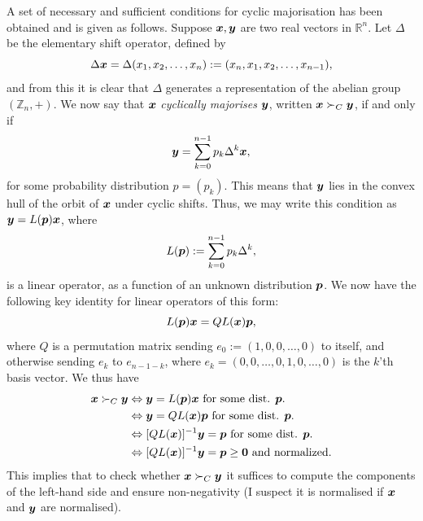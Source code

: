 \documentclass[pra,
aps,
twocolumn,
superscriptaddress,
groupedaddress,
nofootinbib,
reprint
]{revtex4-1}
\begin{document}
A set of necessary and sufficient conditions for cyclic majorisation has been obtained and is given as follows. Suppose $\boldsymbol{x}, \boldsymbol{y}$ are two real vectors in $\mathbb{R}^n$. Let $\Delta$ be the elementary shift operator, defined by
\begin{equation}
\Delta \boldsymbol{x} = \Delta (x_1, x_2, \dots, x_n) := (x_n, x_1, x_2, \dots, x_{n-1}),
\end{equation}
and from this it is clear that $\Delta$ generates a representation of the abelian group $(\mathbb{Z}_n,+)$.
We now say that $\boldsymbol{x}$ \emph{cyclically majorises} $\boldsymbol{y}$, written $\boldsymbol{x} \succ_C \boldsymbol{y}$, if and only if 
\begin{equation}
\boldsymbol{y} = \sum_{k=0}^{n-1} p_k \Delta^k \boldsymbol{x},
\end{equation}
for some probability distribution $p=(p_k)$. This means that $\boldsymbol{y}$ lies in the convex hull of the orbit of $\boldsymbol{x}$ under cyclic shifts. Thus, we may write this condition as $\boldsymbol{y} = L(\boldsymbol{p}) \boldsymbol{x}$, where
\begin{equation}
L(\boldsymbol{p}) :=  \sum_{k=0}^{n-1} p_k \Delta^k,
\end{equation}
is a linear operator, as a function of an unknown distribution $\boldsymbol{p}$. We now have the following key identity for linear operators of this form:
\begin{equation}
L(\boldsymbol{p})\boldsymbol{x} = QL(\boldsymbol{x}) \boldsymbol{p},
\end{equation}
where $Q$ is a permutation matrix sending $e_0:=(1,0,0,\dots ,0)$ to itself, and otherwise sending $e_k$ to $e_{n-1-k}$, where $e_k=  (0,0,\dots, 0,1,0,\dots, 0)$ is the $k$'th basis vector. We thus have
\begin{align}
\boldsymbol{x} \succ_C \boldsymbol{y} &\Leftrightarrow \boldsymbol{y} = L(\boldsymbol{p}) \boldsymbol{x} \mbox{ for some dist. } \boldsymbol{p}. \nonumber \\
&\Leftrightarrow \boldsymbol{y} = QL(\boldsymbol{x}) \boldsymbol{p} \mbox{ for some dist. } \boldsymbol{p}. \nonumber \\
&\Leftrightarrow [QL(\boldsymbol{x})]^{-1}\boldsymbol{y} = \boldsymbol{p} \mbox{ for some dist. } \boldsymbol{p}. \nonumber \\
&\Leftrightarrow [QL(\boldsymbol{x})]^{-1}\boldsymbol{y} = \boldsymbol{p}  \ge \mathbf{0} \mbox{ and normalized}.
\end{align}
This implies that to check whether $\boldsymbol{x} \succ_C \boldsymbol{y}$ it suffices to compute the components of the left-hand side and ensure non-negativity (I suspect it is normalised if $\boldsymbol{x}$ and $\boldsymbol{y}$ are normalised).
\end{document}
